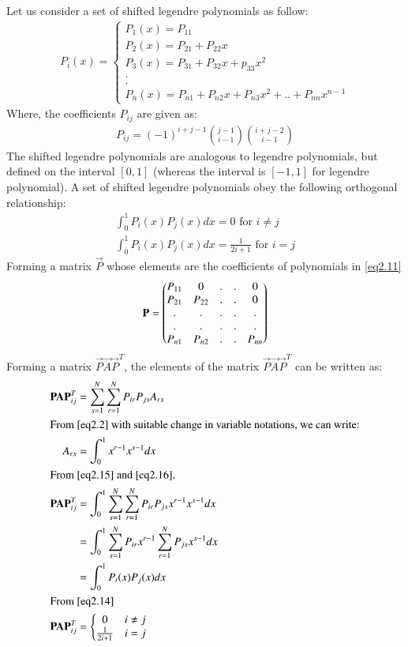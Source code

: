 \documentclass[journal,12pt,twocolumn]{IEEEtran}
\begin{document}
Let us consider a set of shifted legendre polynomials as follow:
\begin{align}
    P_i(x)=
    \left\{\begin{matrix}
P_1(x)=P_{11}\\ 
P_2(x)=P_{21}+P_{22}x\\
P_3(x)=P_{31}+P_{32}x+p_{33}x^2\\
.\\.\\
P_n(x)=P_{n1}+P_{n2}x+P_{n3}x^2+..+P_{nn}x^{n-1}
\end{matrix}\right. \label{eq2.11}
\end{align}
Where, the coefficients $P_{ij}$ are given as:
\begin{align}
P_{ij}=(-1)^{i+j-1} {j-1 \choose i-1} {i+j-2 \choose i-1} \label{eq2.12}
\end{align}
The shifted legendre polynomials are analogous to legendre polynomials, but defined on the interval $[0,1]$ (whereas the interval is $[-1,1]$ for legendre polynomial). \newpage
A set of shifted legendre polynomials obey the following orthogonal relationship:
\begin{align}
    \int_{0}^{1}P_i(x)P_j(x)dx=0\text{ for }i \neq j\\
    \int_{0}^{1}P_i(x)P_j(x)dx=\frac{1}{2i+1}\text{ for }i=j \label{eq2.14}
\end{align}
Forming a matrix $\vec{P}$ whose elements are the coefficients of polynomials in \eqref{eq2.11}
\begin{align}
    \vec{P}=\myvec{P_{11} & 0 &.&.&0\\
    P_{21} & P_{22} &.&.&0\\
    .&.&.&.&.\\.&.&.&.&.\\P_{n1} & P_{n2} &.&.&P_{nn}}
\end{align}
Forming a matrix $\vec{P}\vec{A}\vec{P}^T$, the elements of the matrix $\vec{P}\vec{A}\vec{P}^T$ can be written as:
\begin{align}
    \vec{P}\vec{A}\vec{P}^T_{ij}&=\sum_{s=1}^N\sum_{r=1}^NP_{ir}P_{js}A_{rs} \label{eq2.15}
    \\
    \intertext{From \eqref{eq2.2} with suitable change in variable notations, we can write:}
    A_{rs}&=\int_0^1x^{r-1}x^{s-1}dx \label{eq2.16}\\
    \intertext{From \eqref{eq2.15} and \eqref{eq2.16},}
    \vec{P}\vec{A}\vec{P}^T_{ij}&=\int_0^1\sum_{s=1}^N\sum_{r=1}^NP_{ir}P_{js}x^{r-1}x^{s-1}dx\\
    &=\int_0^1\sum_{s=1}^NP_{ir}x^{r-1}\sum_{r=1}^NP_{js}x^{s-1}dx \\
    &=\int_0^1P_i(x)P_j(x)dx\\
    \intertext{From \eqref{eq2.14}}
    \vec{P}\vec{A}\vec{P}^T_{ij}&=
    \left\{\begin{matrix}
    0 & i\neq j\\ 
    \frac{1}{2i+1} & i=j
    \end{matrix}\right.
\end{align}
\end{document}
